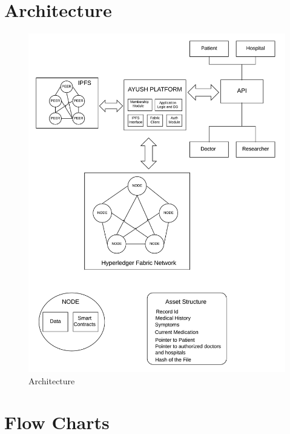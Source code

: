 \documentclass[11pt]{report}
\begin{document}
\section{Architecture}        
\begin{figure}[h!]
        \centering
        \includegraphics[scale=0.7]{arch.jpeg}
        \caption{Architecture}
        \label{fig:my_label}
    \end{figure}
\section{Flow Charts}   
\end{document}

